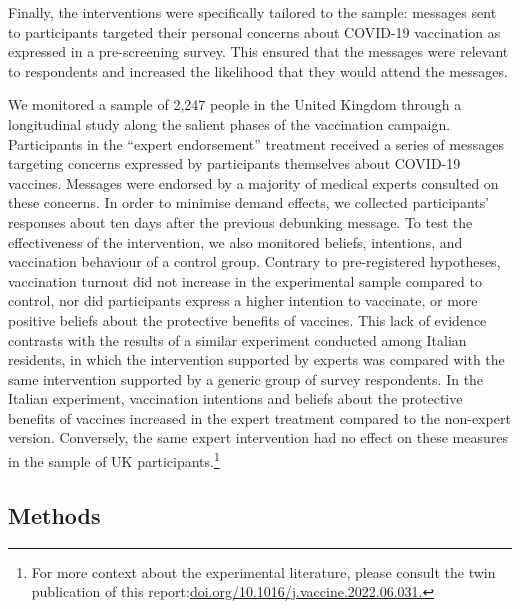 \documentclass[authordate, empirical]{jote-new-article}
\begin{document}
	Finally, the interventions were specifically tailored to the sample: messages sent to participants targeted their personal concerns about COVID-19 vaccination as expressed in a pre-screening survey. This ensured that the messages were relevant to respondents and increased the likelihood that they would attend the messages.



	We monitored a sample of 2,247 people in the United Kingdom through a longitudinal study along the salient phases of the vaccination campaign. Participants in the “expert endorsement” treatment received a series of messages targeting concerns expressed by participants themselves about COVID-19 vaccines. Messages were endorsed by a majority of medical experts consulted on these concerns. In order to minimise demand effects, we collected participants' responses about ten days after the previous debunking message. To test the effectiveness of the intervention, we also monitored beliefs, intentions, and vaccination behaviour of a control group. Contrary to pre-registered hypotheses, vaccination turnout did not increase in the experimental sample compared to control, nor did participants express a higher intention to vaccinate, or more positive beliefs about the protective benefits of vaccines. This lack of evidence contrasts with the results of a similar experiment conducted among Italian residents, \parencites{Ronzani2022} in which the intervention supported by experts was compared with the same intervention supported by a generic group of survey respondents. In the Italian experiment, vaccination intentions and beliefs about the protective benefits of vaccines increased in the expert treatment compared to the non-expert version. Conversely, the same expert intervention had no effect on these measures in the sample of UK participants.\footnote{ For more context about the experimental literature, please consult the twin publication of this report:\href{https://doi.org/10.1016/j.vaccine.2022.06.031}{doi.org/10.1016/j.vaccine.2022.06.031.}}



	\subsection{Methods}
\end{document}

